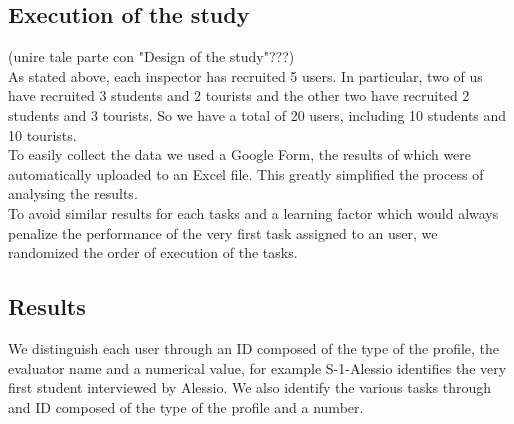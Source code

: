 \subsection{Execution of the study}
    (unire tale parte con "Design of the study"???)\\
    As stated above, each inspector has recruited 5 users. In particular, two of us have recruited 3 students and 2 tourists and the other two have recruited 2 students and 3 tourists. So we have a total of 20 users, including 10 students and 10 tourists.\\
    To easily collect the data we used a Google Form, the results of which were automatically uploaded to an Excel file. This greatly simplified the process of analysing the results.\\
    To avoid similar results for each tasks and a learning factor which would always penalize the performance of the very first task assigned to an user, we randomized the order of execution of the tasks.

\subsection{Results}

    We distinguish each user through an ID composed of the type of the profile, the evaluator name and a numerical value, for example S-1-Alessio identifies the very first student interviewed by Alessio. We also identify the various tasks through and ID composed of the type of the profile and a number.
